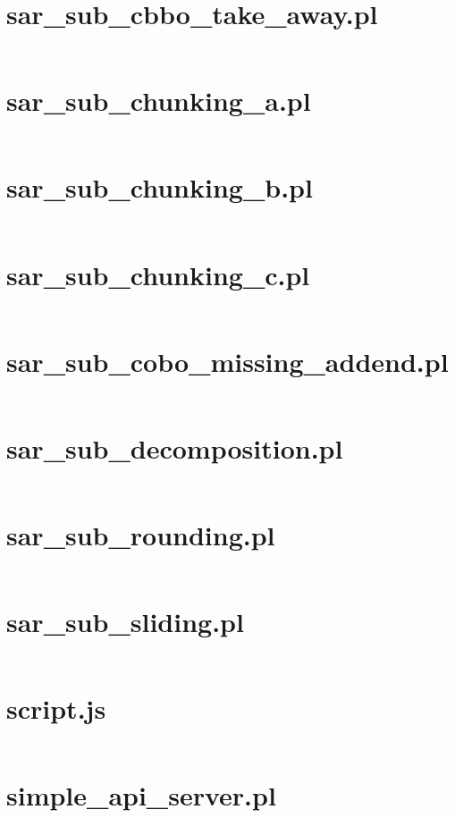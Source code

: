 \documentclass{article}
\begin{document}
\section{sar\_sub\_cbbo\_take\_away.pl}
\inputminted{prolog}{sar_sub_cbbo_take_away.pl}

\section{sar\_sub\_chunking\_a.pl}
\inputminted{prolog}{sar_sub_chunking_a.pl}

\section{sar\_sub\_chunking\_b.pl}
\inputminted{prolog}{sar_sub_chunking_b.pl}

\section{sar\_sub\_chunking\_c.pl}
\inputminted{prolog}{sar_sub_chunking_c.pl}

\section{sar\_sub\_cobo\_missing\_addend.pl}
\inputminted{prolog}{sar_sub_cobo_missing_addend.pl}

\section{sar\_sub\_decomposition.pl}
\inputminted{prolog}{sar_sub_decomposition.pl}

\section{sar\_sub\_rounding.pl}
\inputminted{prolog}{sar_sub_rounding.pl}

\section{sar\_sub\_sliding.pl}
\inputminted{prolog}{sar_sub_sliding.pl}

\section{script.js}
\inputminted{javascript}{script.js}

\section{simple\_api\_server.pl}
\inputminted{prolog}{simple_api_server.pl}
\end{document}
